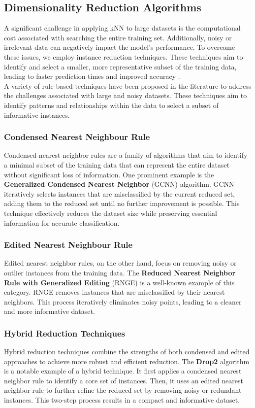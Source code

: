 \subsection{Dimensionality Reduction Algorithms}
\label{subsec:methods-reduction}

A significant challenge in applying kNN to large datasets is the computational cost 
associated with searching the entire training set. Additionally, noisy or irrelevant 
data can negatively impact the model's performance. 
To overcome these issues, we employ instance reduction techniques. 
These techniques aim to identify and select a smaller, more representative subset of
the training data, leading to faster prediction times and improved accuracy \cite{Wilson2000}.\\

A variety of rule-based techniques have been proposed in the literature to 
address the challenges associated with large and noisy datasets. 
These techniques aim to identify patterns and relationships within the data to select 
a subset of informative instances.

\subsubsection{Condensed Nearest Neighbour Rule}
Condensed nearest neighbor rules are a family of algorithms that aim to identify 
a minimal subset of the training data that can represent the entire dataset without 
significant loss of information. One prominent example is the \textbf{Generalized Condensed 
Nearest Neighbor} (GCNN) algorithm.
GCNN iteratively selects instances that are misclassified by the current reduced set, 
adding them to the reduced set until no further improvement is possible. 
This technique effectively reduces the dataset size while preserving essential 
information for accurate classification.


\subsubsection{Edited Nearest Neighbour Rule}
Edited nearest neighbor rules, on the other hand, focus on removing noisy or outlier 
instances from the training data. The \textbf{Reduced Nearest Neighbor Rule with Generalized
Editing} (RNGE) is a well-known example of this category. RNGE removes instances 
that are misclassified by their nearest neighbors. This process iteratively eliminates
 noisy points, leading to a cleaner and more informative dataset.


\subsubsection{Hybrid Reduction Techniques}
Hybrid reduction techniques combine the strengths of both condensed and edited approaches
to achieve more robust and efficient reduction. The \textbf{Drop2} algorithm is a notable example
of a hybrid technique. It first applies a condensed nearest neighbor rule to identify a
core set of instances. Then, it uses an edited nearest neighbor rule to further refine
the reduced set by removing noisy or redundant instances.
This two-step process results in a compact and informative dataset.

